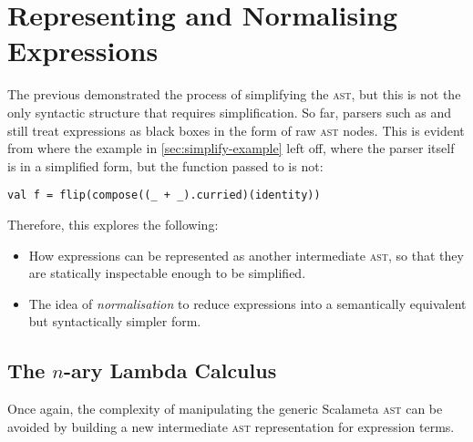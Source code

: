 \documentclass[../../../main.tex]{subfiles}
\begin{document}
\section{Representing and Normalising Expressions}\label{sec:simplify-exprs}


The previous  demonstrated the process of simplifying the  \textsc{ast}, but this is not the only syntactic structure that requires simplification.
So far, parsers such as  and  still treat expressions as black boxes in the form of raw  \textsc{ast} nodes.
This is evident from where the example in \cref{sec:simplify-example} left off, where the parser itself is in a simplified form, but the function passed to  is not:
\begin{verbatim}
val f = flip(compose((_ + _).curried)(identity))
\end{verbatim}
%
Therefore, this  explores the following:
\begin{itemize}
  \item How expressions can be represented as another intermediate \textsc{ast}, so that they are statically inspectable enough to be simplified.
  \item The idea of \emph{normalisation} to reduce expressions into a semantically equivalent but syntactically simpler form.
\end{itemize}

\subsection{The $n$-ary Lambda Calculus}
Once again, the complexity of manipulating the generic Scalameta \textsc{ast} can be avoided by building a new intermediate \textsc{ast} representation for expression terms.
\end{document}
